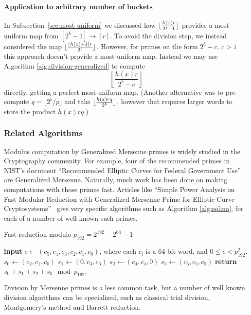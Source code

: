 \paragraph{Application to arbitrary number of buckets}
In Subsection~\ref{sec:most-uniform} we discussed how $\lfloor {\frac{h(x)r}{2^b-1}} \rfloor$ provides a most uniform map from $[2^b-1]\to[r]$.
To avoid the division step, we instead considered the map
$\lfloor {\frac{(h(x)+1)r}{2^b}} \rfloor$.
However, for primes on the form $2^b-c$, $c>1$ this approach doesn't provide a most-uniform map.
%
Instead we may use Algorithm \ref{alg:division-generalized} to compute
$$\left\lfloor\frac{h(x)r}{2^b-c}\right\rfloor$$
directly, getting a perfect most-uniform map.
(Another alternative was to pre-compute $q = \lfloor2^b/p\rfloor$ and take
$\lfloor {\frac{h(x)rq}{2^b}} \rfloor$, however that requires larger words to store the product $h(x)rq$.)


\subsubsection{Related Algorithms}

Modulus computation by Generalized Mersenne primes is widely studied in the Cryptography community.
For example, four of the recommended primes in NIST's document ``Recommended Elliptic Curves for Federal Government Use'' are Generalized Mersenne.
Naturally, much work has been done on making computations with those primes fast.
Articles like ``Simple Power Analysis on Fast Modular Reduction with Generalized Mersenne Prime for Elliptic Curve Cryptosystems''~\cite{sakai2006simple}
give very specific algorithms such as Algorithm \ref{alg:solina}, for each of a number of well known such primes.

\begin{algorithm}[H]
   \caption{Fast reduction modulo $p_{192} = 2^{192} - 2^{64} - 1$}
   \label{alg:solina}
   \begin{algorithmic}
      \State \textbf{input} $c \gets (c_5, c_4, c_3, c_2, c_1, c_0)$, where each $c_i$ is a 64-bit word, and $0 \le c < p^2_{192}$.
      \State $s_0 \gets (c_2, c_1, c_0)$
      \State $s_1 \gets (0, c_3, c_3)$
      \State $s_2 \gets (c_4, c_4, 0)$
      \State $s_3 \gets (c_5, c_5, c_5)$
      \State \textbf{return} $s_0 + s_1 + s_2 + s_3 \mod p_{192}$.
   \end{algorithmic}
\end{algorithm}

Division by Mersenne primes is a less common task, but a number of well known division algorithms can be specialized, such as 
 classical trial division, Montgomery's method and Barrett reduction.


